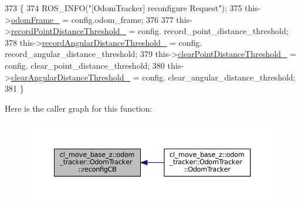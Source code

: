\begin{DoxyCode}
373         \{
374             ROS\_INFO(\textcolor{stringliteral}{"[OdomTracker] reconfigure Request"});
375             this->\hyperlink{classcl__move__base__z_1_1odom__tracker_1_1OdomTracker_a54f31af5e74006560d94f266297853d4}{odomFrame\_} = config.odom\_frame;
376 
377             this->\hyperlink{classcl__move__base__z_1_1odom__tracker_1_1OdomTracker_a3a1173716d527bd182d04656491e01dd}{recordPointDistanceThreshold\_} = config.
      record\_point\_distance\_threshold;
378             this->\hyperlink{classcl__move__base__z_1_1odom__tracker_1_1OdomTracker_a1274fe5334c109cd9c2339beb9411441}{recordAngularDistanceThreshold\_} = config.
      record\_angular\_distance\_threshold;
379             this->\hyperlink{classcl__move__base__z_1_1odom__tracker_1_1OdomTracker_a7155d25d0e8dd9f237a79ff503b80e26}{clearPointDistanceThreshold\_} = config.
      clear\_point\_distance\_threshold;
380             this->\hyperlink{classcl__move__base__z_1_1odom__tracker_1_1OdomTracker_a1b79dd86745adfb31db822e0c8106282}{clearAngularDistanceThreshold\_} = config.
      clear\_angular\_distance\_threshold;
381         \}
\end{DoxyCode}
Here is the caller graph for this function\+:
\nopagebreak
\begin{figure}[H]
\begin{center}
\leavevmode
\includegraphics[width=350pt]{classcl__move__base__z_1_1odom__tracker_1_1OdomTracker_adb06a17455b8d545034d8845706e2886_icgraph}
\end{center}
\end{figure}
\mbox{\label{classcl__move__base__z_1_1odom__tracker_1_1OdomTracker_a8f728f85d1f3f49f4b94e37052a59d6d}} 
